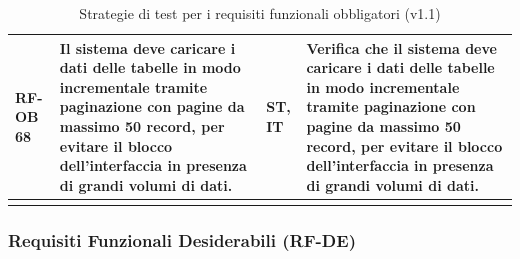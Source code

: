 \documentclass[a4paper,11pt,oneside]{scrartcl}
\begin{document}
\begin{longtable}{|p{1.5cm}|p{4.5cm}|p{1.8cm}|p{6cm}|}
RF-OB 68 & Il sistema deve caricare i dati delle tabelle in modo incrementale tramite paginazione con pagine da massimo 50 record, per evitare il blocco dell'interfaccia in presenza di grandi volumi di dati. & ST, IT & Verifica che il sistema deve caricare i dati delle tabelle in modo incrementale tramite paginazione con pagine da massimo 50 record, per evitare il blocco dell'interfaccia in presenza di grandi volumi di dati. \\ \hline
\caption{Strategie di test per i requisiti funzionali obbligatori (v1.1)}
\end{longtable}

\newpage
\subsubsection{Requisiti Funzionali Desiderabili (RF-DE)}
\end{document}
